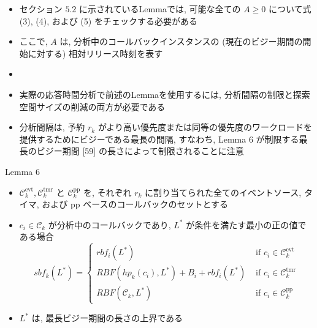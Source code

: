 \begin{frame}{}
    \begin{itemize}
        \item セクション $5.2$ に示されているLemmaでは, 可能な全ての $A \geq 0$ について式 (3), (4), および (5) をチェックする必要がある
        \item ここで, $A$ は, 分析中のコールバックインスタンスの (現在のビジー期間の開始に対する) 相対リリース時刻を表す
        \item
        \item 実際の応答時間分析で前述のLemmaを使用するには, 分析間隔の制限と探索空間サイズの削減の両方が必要である
        \item 分析間隔は, 予約 $r_{k}$ がより高い優先度または同等の優先度のワークロードを提供するためにビジーである最長の間隔, すなわち, Lemma 6 が制限する最長のビジー期間 [59] の長さによって制限されることに注意
    \end{itemize}
\end{frame}

\begin{frame}[label=lemma6]{Lemma 6}
    \begin{lemma}[]
        \begin{itemize}
            \item $\mathcal{C}_{k}^{\mathrm{evt}}, \mathcal{C}_{k}^{\mathrm{tmr}}$ と $\mathcal{C}_{k}^{\mathrm{pp}}$ を, それぞれ $r_{k}$ に割り当てられた全てのイベントソース, タイマ, および pp ベースのコールバックのセットとする
            \item $c_{i} \in \mathcal{C}_{k}$ が分析中のコールバックであり, $L^{*}$ が条件を満たす最小の正の値である場合
                  \begin{equation*}
                      s b f_{k}\left(L^{*}\right)= \begin{cases}r b f_{i}\left(L^{*}\right) & \text { if } c_{i} \in \mathcal{C}_{k}^{\mathrm{evt}} \\ R B F\left(h p_{k}\left(c_{i}\right), L^{*}\right)+B_{i}+r b f_{i}\left(L^{*}\right) & \text { if } c_{i} \in \mathcal{C}_{k}^{\mathrm{tmr}} \\ R B F\left(\mathcal{C}_{k}, L^{*}\right) & \text { if } c_{i} \in \mathcal{C}_{k}^{\mathrm{pp}}\end{cases}
                  \end{equation*}

            \item $L^{*}$ は, 最長ビジー期間の長さの上界である
        \end{itemize}
    \end{lemma}
\end{frame}


